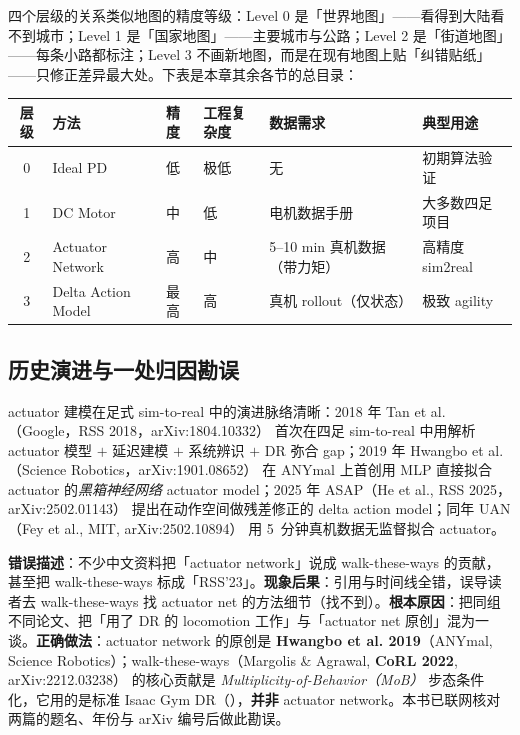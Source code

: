四个层级的关系类似地图的精度等级：Level 0 是「世界地图」——看得到大陆看不到城市；Level 1 是「国家地图」——主要城市与公路；Level 2 是「街道地图」——每条小路都标注；Level 3 不画新地图，而是在现有地图上贴「纠错贴纸」——只修正差异最大处。下表是本章其余各节的总目录：

\begin{center}
\small
\begin{tabular}{@{}clllll@{}}
\toprule
层级 & 方法 & 精度 & 工程复杂度 & 数据需求 & 典型用途 \\
\midrule
0 & Ideal PD & 低 & 极低 & 无 & 初期算法验证 \\
1 & DC Motor & 中 & 低 & 电机数据手册 & 大多数四足项目 \\
2 & Actuator Network & 高 & 中 & 5--10 min 真机数据（带力矩） & 高精度 sim2real \\
3 & Delta Action Model & 最高 & 高 & 真机 rollout（仅状态） & 极致 agility \\
\bottomrule
\end{tabular}
\end{center}

\subsection{历史演进与一处归因勘误}
\label{sec:rlmc-act-history}

actuator 建模在足式 sim-to-real 中的演进脉络清晰：2018 年 Tan et al.（Google，RSS 2018，arXiv:1804.10332）\cite{tan2018simtoreal} 首次在四足 sim-to-real 中用解析 actuator 模型 $+$ 延迟建模 $+$ 系统辨识 $+$ DR 弥合 gap；2019 年 Hwangbo et al.（Science Robotics，arXiv:1901.08652）\cite{hwangbo2019} 在 ANYmal 上首创用 MLP 直接拟合 actuator 的\emph{黑箱神经网络} actuator model；2025 年 ASAP（He et al., RSS 2025，arXiv:2502.01143）\cite{he2025asap} 提出在动作空间做残差修正的 delta action model；同年 UAN（Fey et al., MIT, arXiv:2502.10894）\cite{fey2025uan} 用 5~分钟真机数据无监督拟合 actuator。

\begin{pitfall}
\textbf{错误描述}：不少中文资料把「actuator network」说成 walk-these-ways 的贡献，甚至把 walk-these-ways 标成「RSS'23」。\textbf{现象后果}：引用与时间线全错，误导读者去 walk-these-ways 找 actuator net 的方法细节（找不到）。\textbf{根本原因}：把同组不同论文、把「用了 DR 的 locomotion 工作」与「actuator net 原创」混为一谈。\textbf{正确做法}：actuator network 的原创是 \textbf{Hwangbo et al. 2019}（ANYmal, Science Robotics）\cite{hwangbo2019}；walk-these-ways（Margolis \& Agrawal, \textbf{CoRL 2022}, arXiv:2212.03238）\cite{margolis2022walk} 的核心贡献是 \emph{Multiplicity-of-Behavior（MoB）} 步态条件化，它用的是标准 Isaac Gym DR（\cite{rudin2021minutes}），\textbf{并非} actuator network。本书已联网核对两篇的题名、年份与 arXiv 编号后做此勘误。
\end{pitfall}

